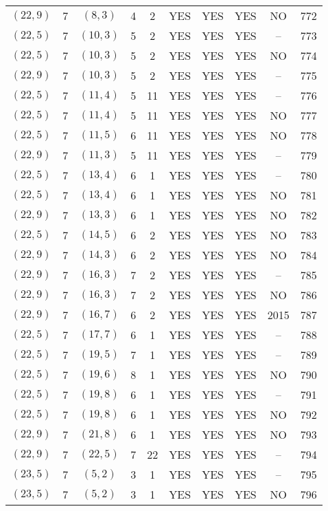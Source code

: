 \begin{longtable}{|c|c|c|c|c|c|c|c|c|c|}
$(22, 9)$ & 7 & $(8, 3)$ & 4 & 2 & YES & YES & YES & NO & 772\\
$(22, 5)$ & 7 & $(10, 3)$ & 5 & 2 & YES & YES & YES & -- & 773\\
$(22, 5)$ & 7 & $(10, 3)$ & 5 & 2 & YES & YES & YES & NO & 774\\
$(22, 9)$ & 7 & $(10, 3)$ & 5 & 2 & YES & YES & YES & -- & 775\\
$(22, 5)$ & 7 & $(11, 4)$ & 5 & 11 & YES & YES & YES & -- & 776\\
$(22, 5)$ & 7 & $(11, 4)$ & 5 & 11 & YES & YES & YES & NO & 777\\
$(22, 5)$ & 7 & $(11, 5)$ & 6 & 11 & YES & YES & YES & NO & 778\\
$(22, 9)$ & 7 & $(11, 3)$ & 5 & 11 & YES & YES & YES & -- & 779\\
$(22, 5)$ & 7 & $(13, 4)$ & 6 & 1 & YES & YES & YES & -- & 780\\
$(22, 5)$ & 7 & $(13, 4)$ & 6 & 1 & YES & YES & YES & NO & 781\\
$(22, 9)$ & 7 & $(13, 3)$ & 6 & 1 & YES & YES & YES & NO & 782\\
$(22, 5)$ & 7 & $(14, 5)$ & 6 & 2 & YES & YES & YES & NO & 783\\
$(22, 9)$ & 7 & $(14, 3)$ & 6 & 2 & YES & YES & YES & NO & 784\\
$(22, 9)$ & 7 & $(16, 3)$ & 7 & 2 & YES & YES & YES & -- & 785\\
$(22, 9)$ & 7 & $(16, 3)$ & 7 & 2 & YES & YES & YES & NO & 786\\
$(22, 9)$ & 7 & $(16, 7)$ & 6 & 2 & YES & YES & YES & 2015 & 787\\
$(22, 5)$ & 7 & $(17, 7)$ & 6 & 1 & YES & YES & YES & -- & 788\\
$(22, 5)$ & 7 & $(19, 5)$ & 7 & 1 & YES & YES & YES & -- & 789\\
$(22, 5)$ & 7 & $(19, 6)$ & 8 & 1 & YES & YES & YES & NO & 790\\
$(22, 5)$ & 7 & $(19, 8)$ & 6 & 1 & YES & YES & YES & -- & 791\\
$(22, 5)$ & 7 & $(19, 8)$ & 6 & 1 & YES & YES & YES & NO & 792\\
$(22, 9)$ & 7 & $(21, 8)$ & 6 & 1 & YES & YES & YES & NO & 793\\
$(22, 9)$ & 7 & $(22, 5)$ & 7 & 22 & YES & YES & YES & -- & 794\\
$(23, 5)$ & 7 & $(5, 2)$ & 3 & 1 & YES & YES & YES & -- & 795\\
$(23, 5)$ & 7 & $(5, 2)$ & 3 & 1 & YES & YES & YES & NO & 796\\

\end{longtable}
